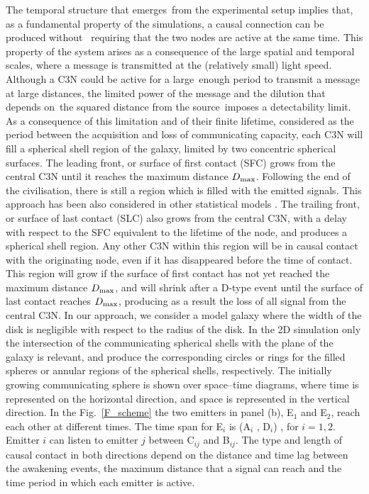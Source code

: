 \documentclass[crop]{CSLB}
\newcommand{\ceti}{C3N}
\begin{document}
The temporal structure that emerges from the experimental setup implies that,
as a fundamental property of the simulations, a causal connection can be
produced without  requiring that the two nodes are active at the same time.
%
This property of the system arises as a consequence of the large spatial and
temporal scales, where a message is transmitted at the (relatively small) light
speed.
%
Although a \ceti{} could be active for a large enough period to transmit a
message at large distances, the limited power of the message and the dilution
that depends on the squared distance from the source imposes a detectability
limit.
%
As a consequence of this limitation and of their finite lifetime, considered as
the period between the acquisition and loss of communicating capacity, each
\ceti{} will fill a spherical shell region of the galaxy, limited by two
concentric spherical surfaces.
%
The leading front, or surface of first contact (SFC) grows from the central
\ceti{} until it reaches the maximum distance $D_{\rm max}$.
%
Following the end of the civilisation, there is still a region which is filled
with the emitted signals.
%
This approach has been also considered in other statistical models \citep[e.g.,
][]{smith_broadcasting_2009, grimaldi_signal_2017, Grimaldi2018}.
%
The trailing front, or surface of last contact (SLC) also grows from the
central \ceti{}, with a delay with respect to the SFC equivalent to the
lifetime of the node, and produces a spherical shell region.
%
Any other \ceti{} within this region will be in causal contact with the originating node,
even if it has disappeared before the time of contact.
%
This region will grow if the surface of first contact has not yet reached the
maximum distance $D_{\rm max}$, and will shrink after a D-type event until the
surface of last contact reaches $D_{\rm max}$, producing as a result the loss
of all signal from the central \ceti{}.
%
In our approach, we consider a model galaxy where the width of the disk is
negligible with respect to the radius of the disk.
%
In the 2D simulation only the intersection of the communicating spherical
shells with the plane of the galaxy is relevant, and produce the corresponding
circles or rings for the filled spheres or annular regions of the spherical
shells, respectively.
%
The initially growing communicating sphere is shown over space--time diagrams,
where time is represented on the horizontal direction, and space is represented
in the vertical direction.
%
In the Fig.~\ref{F_scheme} the two emitters in panel (b), E$_1$ and E$_2$,
reach each other at different times.
%
The time span for E$_i$ is (A$_i$ , D$_i$) , for $i = {1, 2}$.
%
Emitter $i$ can listen to emitter $j$ between C$_{ij}$ and B$_{ij}$.
%
The type and length of causal contact in both directions depend on the distance
and time lag between the awakening events, the maximum distance that a signal
can reach and the time period in which each emitter is active.
\end{document}
